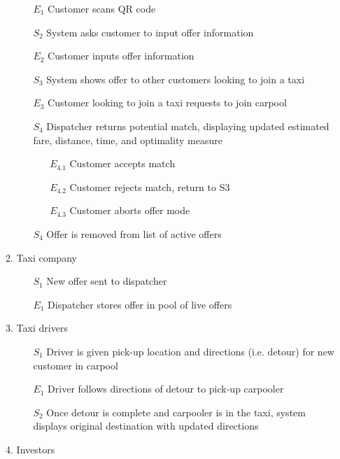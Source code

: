 \documentclass[]{article}
\begin{document}
\begin{enumerate}[{\textbf{BE}}1.]
\begin{enumerate}[{VP4}.1]
\begin{enumerate}
                \item[$E_1$] Customer scans QR code
                \item[$S_2$] System asks customer to input offer information
                \item[$E_2$] Customer inputs offer information
                \item[$S_3$] System shows offer to other customers looking to join a taxi
                \item[$E_3$] Customer looking to join a taxi requests to join carpool
                \item[$S_4$] Dispatcher returns potential match, displaying updated estimated fare, distance, time, and optimality measure
                \begin{enumerate}
                    \item[$E_{4.1}$] Customer accepts match
                    \item[$E_{4.2}$] Customer rejects match, return to S3
                    \item[$E_{4.3}$] Customer aborts offer mode
                \end{enumerate}
                \item[$S_4$] Offer is removed from list of active offers
            \end{enumerate}
        \item Taxi company
            \begin{enumerate}
                \item[$S_1$] New offer sent to dispatcher
                \item[$E_1$] Dispatcher stores offer in pool of live offers
            \end{enumerate}
        \item Taxi drivers
            \begin{enumerate}
                \item[$S_1$] Driver is given pick-up location and directions (i.e. detour) for new customer in carpool
                \item[$E_1$] Driver follows directions of detour to pick-up carpooler
                \item[$S_2$] Once detour is complete and carpooler is in the taxi, system displays original destination with updated directions
            \end{enumerate}
        \item Investors
            \begin{enumerate}

\end{enumerate}
\end{enumerate}
\end{enumerate}
\end{document}
